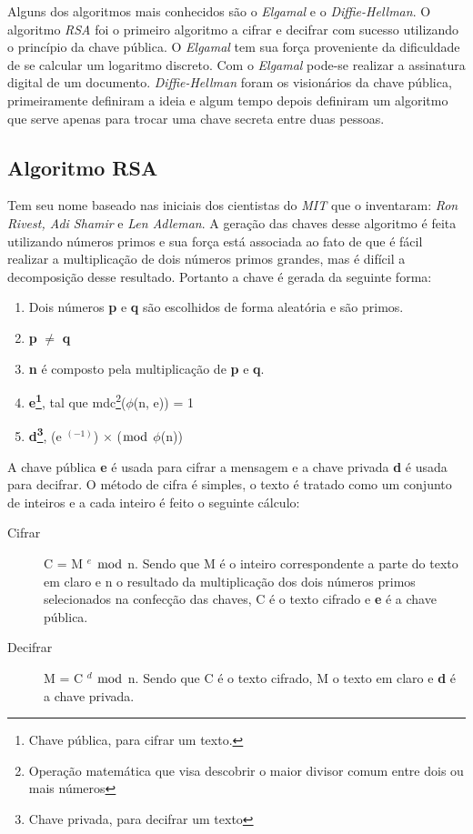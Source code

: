 %
Alguns dos algoritmos mais conhecidos são o \textit{Elgamal} e o \textit{Diffie-Hellman}. O algoritmo \textit{RSA} foi o primeiro algoritmo a cifrar e decifrar com sucesso utilizando o princípio da chave pública. O \textit{Elgamal} tem sua força proveniente da dificuldade de se calcular um logaritmo discreto. Com o \textit{Elgamal} pode-se realizar a assinatura digital de um documento. \textit{Diffie-Hellman} foram os visionários da chave pública, primeiramente definiram a ideia e algum tempo depois definiram um algoritmo que serve apenas para trocar uma chave secreta entre duas pessoas. 

\subsection{Algoritmo RSA}
\label{algorithm-rsa}

Tem seu nome baseado nas iniciais dos cientistas do \textit{MIT} que o inventaram: \textit{Ron Rivest, Adi Shamir} e \textit{Len Adleman}. A geração das chaves desse algoritmo é feita utilizando números primos e sua força está associada ao fato de que é fácil realizar a multiplicação de dois números primos grandes, mas é difícil a decomposição desse resultado. Portanto a chave é gerada da seguinte forma:

\begin{enumerate}
\item Dois números \textbf{p} e \textbf{q} são escolhidos de forma aleatória e são primos.
\item \textbf{p} $\neq$ \textbf{q}
\item \textbf{n} é composto pela multiplicação de \textbf{p} e \textbf{q}.
\item \textbf{e\footnote{Chave pública, para cifrar um texto.}}, tal que mdc\footnote{Operação matemática que visa descobrir o maior divisor comum entre dois ou mais números}($\phi$(n, e)) = 1
\item \textbf{d\footnote{Chave privada, para decifrar um texto }}, (e $^ {(-1)}$) $\times$ ($\bmod$ $\phi$(n)) 
\end{enumerate}

%
A chave pública \textbf{e}  é usada para cifrar a mensagem e a chave privada \textbf{d} é usada para decifrar. O método de cifra é simples, o texto é tratado como um conjunto de inteiros e a cada inteiro é feito o seguinte cálculo:

\begin{description}
\item [Cifrar]
C = M $^ e$ $\bmod$ n. Sendo que M é o inteiro correspondente a parte do texto em claro e n o resultado da multiplicação dos dois números primos selecionados na confecção  das chaves, C é o texto cifrado e \textbf{e} é a chave pública. 
\item [Decifrar]
M = C $^ d$ $\bmod$ n. Sendo que C é o texto cifrado, M o texto em claro e \textbf{d} é a chave privada.
\end{description}


